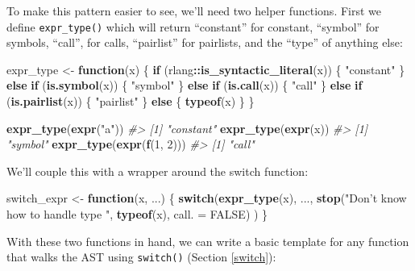 \documentclass[]{book}
\newenvironment{Shaded}{\begin{snugshade}}{\end{snugshade}}
\newcommand{\CommentTok}[1]{\textcolor[rgb]{0.37,0.37,0.37}{\textit{#1}}}
\newcommand{\ControlFlowTok}[1]{\textcolor[rgb]{0.27,0.27,0.27}{\textbf{#1}}}
\newcommand{\DataTypeTok}[1]{\textcolor[rgb]{0.27,0.27,0.27}{#1}}
\newcommand{\DecValTok}[1]{\textcolor[rgb]{0.06,0.06,0.06}{#1}}
\newcommand{\KeywordTok}[1]{\textcolor[rgb]{0.27,0.27,0.27}{\textbf{#1}}}
\newcommand{\NormalTok}[1]{#1}
\newcommand{\OperatorTok}[1]{\textcolor[rgb]{0.43,0.43,0.43}{\textbf{#1}}}
\newcommand{\OtherTok}[1]{\textcolor[rgb]{0.37,0.37,0.37}{#1}}
\newcommand{\StringTok}[1]{\textcolor[rgb]{0.5,0.5,0.5}{#1}}
\begin{document}
To make this pattern easier to see, we'll need two helper functions. First we define \texttt{expr\_type()} which will return ``constant'' for constant, ``symbol'' for symbols, ``call'', for calls, ``pairlist'' for pairlists, and the ``type'' of anything else:

\begin{Shaded}
\begin{Highlighting}[]
\NormalTok{expr_type <-}\StringTok{ }\ControlFlowTok{function}\NormalTok{(x) \{}
  \ControlFlowTok{if}\NormalTok{ (rlang}\OperatorTok{::}\KeywordTok{is_syntactic_literal}\NormalTok{(x)) \{}
    \StringTok{"constant"}
\NormalTok{  \} }\ControlFlowTok{else} \ControlFlowTok{if}\NormalTok{ (}\KeywordTok{is.symbol}\NormalTok{(x)) \{}
    \StringTok{"symbol"}
\NormalTok{  \} }\ControlFlowTok{else} \ControlFlowTok{if}\NormalTok{ (}\KeywordTok{is.call}\NormalTok{(x)) \{}
    \StringTok{"call"}
\NormalTok{  \} }\ControlFlowTok{else} \ControlFlowTok{if}\NormalTok{ (}\KeywordTok{is.pairlist}\NormalTok{(x)) \{}
    \StringTok{"pairlist"}
\NormalTok{  \} }\ControlFlowTok{else}\NormalTok{ \{}
    \KeywordTok{typeof}\NormalTok{(x)}
\NormalTok{  \}}
\NormalTok{\}}

\KeywordTok{expr_type}\NormalTok{(}\KeywordTok{expr}\NormalTok{(}\StringTok{"a"}\NormalTok{))}
\CommentTok{#> [1] "constant"}
\KeywordTok{expr_type}\NormalTok{(}\KeywordTok{expr}\NormalTok{(x))}
\CommentTok{#> [1] "symbol"}
\KeywordTok{expr_type}\NormalTok{(}\KeywordTok{expr}\NormalTok{(}\KeywordTok{f}\NormalTok{(}\DecValTok{1}\NormalTok{, }\DecValTok{2}\NormalTok{)))}
\CommentTok{#> [1] "call"}
\end{Highlighting}
\end{Shaded}

We'll couple this with a wrapper around the switch function:

\begin{Shaded}
\begin{Highlighting}[]
\NormalTok{switch_expr <-}\StringTok{ }\ControlFlowTok{function}\NormalTok{(x, ...) \{}
  \ControlFlowTok{switch}\NormalTok{(}\KeywordTok{expr_type}\NormalTok{(x),}
\NormalTok{    ...,}
    \KeywordTok{stop}\NormalTok{(}\StringTok{"Don't know how to handle type "}\NormalTok{, }\KeywordTok{typeof}\NormalTok{(x), }\DataTypeTok{call. =} \OtherTok{FALSE}\NormalTok{)}
\NormalTok{  )}
\NormalTok{\}}
\end{Highlighting}
\end{Shaded}

With these two functions in hand, we can write a basic template for any function that walks the AST using \texttt{switch()} (Section \ref{switch}):
\end{document}
